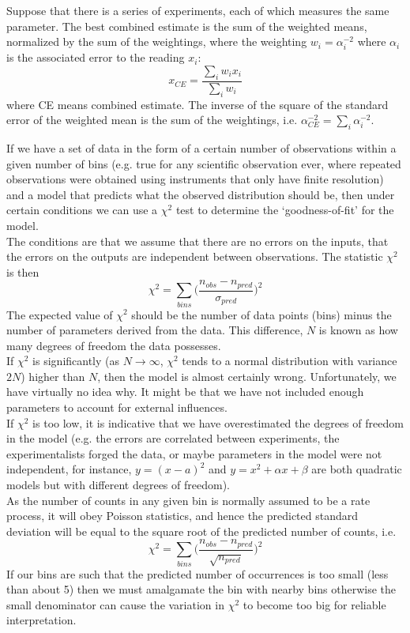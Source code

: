 \documentclass[a4paper]{article}
\begin{document}
\begin{Note}
Suppose that there is a series of experiments, each of which measures the same parameter. The best combined estimate is the sum of the weighted means, normalized by the sum of the weightings, where the weighting $w_i=\alpha_i^{-2}$ where $\alpha_i$ is the associated error to the reading $x_i$:
$$x_{CE}=\frac{\sum_iw_ix_i}{\sum_iw_i}$$
where CE means combined estimate. The inverse of the square of the standard error of the weighted mean is the sum of the weightings, i.e. $\alpha^{-2}_{CE}=\sum_i\alpha_i^{-2}$.
\end{Note}
\newpage
\begin{Note}
If we have a set of data in the form of a certain number of observations within a given number of bins (e.g. true for any scientific observation ever, where repeated observations were obtained using instruments that only have finite resolution) and a model that predicts what the observed distribution should be, then under certain conditions we can use a $\chi^2$ test to determine the `goodness-of-fit' for the model.\\[5pt]
The conditions are that we assume that there are no errors on the inputs, that the errors on the outputs are independent between observations. The statistic $\chi^2$ is then
$$\chi^2=\sum_{bins}\bigg(\frac{n_{obs}-n_{pred}}{\sigma_{pred}}\bigg)^2$$
The expected value of $\chi^2$ should be the number of data points (bins) minus the number of parameters derived from the data. This difference, $N$ is known as how many degrees of freedom the data possesses.\\[5pt]
If $\chi^2$ is significantly (as $N \rightarrow\infty$, $\chi^2$ tends to a normal distribution with variance $2N$) higher than $N$, then the model is almost certainly wrong. Unfortunately, we have virtually no idea why. It might be that we have not included enough parameters to account for external influences.\\[5pt]
If $\chi^2$ is too low, it is indicative that we have overestimated the degrees of freedom in the model (e.g. the errors are correlated between experiments, the experimentalists forged the data, or maybe parameters in the model were not independent, for instance, $y=(x-a)^2$ and $y=x^2+\alpha x+\beta$ are both quadratic models but with different degrees of freedom).\\[5pt]
As the number of counts in any given bin is normally assumed to be a rate process, it will obey Poisson statistics, and hence the predicted standard deviation will be equal to the square root of the predicted number of counts, i.e.
$$\chi^2=\sum_{bins}\bigg(\frac{n_{obs}-n_{pred}}{\sqrt{n_{pred}}}\bigg)^2$$
If our bins are such that the predicted number of occurrences is too small (less than about 5) then we must amalgamate the bin with nearby bins otherwise the small denominator can cause the variation in $\chi^2$ to become too big for reliable interpretation.
\end{Note}
\end{document}
